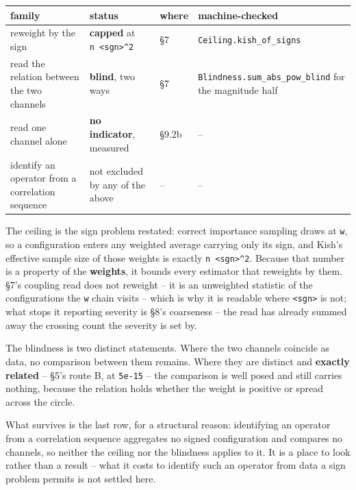\documentclass[10pt,letterpaper,twocolumn]{article}
\begin{document}
\begin{table}[tp]
\centering\footnotesize
\begin{tabular}{L{0.290\textwidth}L{0.267\textwidth}L{0.042\textwidth}L{0.335\textwidth}}
\toprule
family & status & where & machine-checked \\
\midrule
reweight by the sign & \textbf{capped} at
\texttt{n\ \textless{}\allowbreak{}sgn\textgreater{}\allowbreak{}\^{}2} & §7 & \texttt{Ceiling.\allowbreak{}kish\_\allowbreak{}of\_\allowbreak{}signs} \\
read the relation between the two channels & \textbf{blind}, two ways & §7 & \texttt{Blindness.\allowbreak{}sum\_\allowbreak{}abs\_\allowbreak{}pow\_\allowbreak{}blind}
for the magnitude half \\
read one channel alone & \textbf{no indicator}, measured & §9.2b & -- \\
identify an operator from a correlation sequence & not excluded by any of the above & -- & -- \\
\bottomrule
\end{tabular}
\end{table}

The ceiling is the sign problem restated: correct importance sampling draws at \texttt{\textbar{}\allowbreak{}w\textbar{}\allowbreak{}}, so a
configuration enters any weighted average carrying only its sign, and Kish's effective sample size
of those weights is exactly \texttt{n\ \textless{}\allowbreak{}sgn\textgreater{}\allowbreak{}\^{}2}. Because that number is a property of the \textbf{weights}, it
bounds every estimator that reweights by them. §7's coupling read does not reweight -- it is an
unweighted statistic of the configurations the \texttt{\textbar{}\allowbreak{}w\textbar{}\allowbreak{}} chain visits -- which is why it is readable
where \texttt{\textless{}\allowbreak{}sgn\textgreater{}\allowbreak{}} is not; what stops it reporting severity is §8's coarseness -- the read has already
summed away the crossing count the severity is set by.

The blindness is two distinct statements. Where the two channels coincide as data, no comparison
between them remains. Where they are distinct and \textbf{exactly related} -- §5's route B, at \texttt{5e-{}\allowbreak{}15} --
the comparison is well posed and still carries nothing, because the relation holds whether the
weight is positive or spread across the circle.

What survives is the last row, for a structural reason: identifying an operator from a
correlation sequence aggregates no signed configuration and compares no channels, so neither the
ceiling nor the blindness applies to it. It is a place to look rather than a result -- what it
costs to identify such an operator from data a sign problem permits is not settled here.
\end{document}
